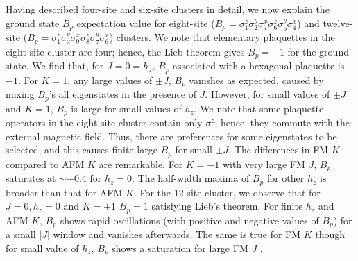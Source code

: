 \documentclass[aps,amsmath,twocolumn,amssymb,floatfix,showpacs,superscriptaddress,nofootinbib,longbibliography]{revtex4-1}
\begin{document}
\\\\\indent
Having described four-site and six-site clusters in detail, we now explain the ground state $B_p$ expectation value for eight-site ($B_p=\sigma_1^z\sigma_2^y\sigma_7^x\sigma_6^z\sigma_5^y\sigma_4^x$) and twelve-site ($B_p=\sigma_1^z\sigma_2^y\sigma_9^x\sigma_8^z\sigma_7^y\sigma_6^x$) clusters. We note that elementary plaquettes in the eight-site cluster are four; hence, the Lieb theorem gives $B_p=-1$ for the ground state. We find that, for $J=0=h_z$, $B_p$ associated with a hexagonal plaquette is $-1$.
For $K=1$, any large values of $\pm J$, $B_p$ vanishes as expected, caused by mixing $B_p$'s all eigenstates in the presence of $J$. However, for small values of $\pm J$ and $K=1$, $B_p$ is large for small values of $h_z$. 
We note that some plaquette operators in the eight-site cluster contain only $\sigma^z$; hence, they commute with the external magnetic field. Thus, there are preferences for some eigenstates to be selected, and this causes finite large $B_p$ for small $\pm J$. The differences in FM $K$ compared to AFM $K$ are remarkable. For $K=-1$ with very large FM $J$, $B_p$ saturates at $\sim-0.4$ for $h_z=0$. The half-width maxima of $B_p$ for other $h_z$ is broader than that for AFM $K$. For the 12-site cluster, we observe that for $J=0, h_z=0$ and $K=\pm 1$ $B_p=1$ satisfying Lieb's theorem. For finite $h_z$ and AFM $K$, $B_p$ shows rapid oscillations (with positive and negative values of $B_p$) for a small $|J|$ window and vanishes afterwards. The same is true for FM $K$ though for small value of $h_z$, $B_p$ shows a saturation for large FM $J$ \cite{zhu-2018,han-li-2023,nandini-2019,liang-2018,yilmaz-2022}.
\end{document}

